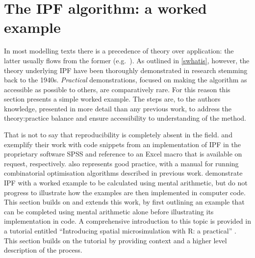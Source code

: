 \documentclass[a4paper,10pt]{article}
\begin{document}
\section{The IPF algorithm: a worked example} \label{s:theory}
In most modelling texts there is a precedence of theory over
application: the latter usually flows from the former
(e.g.~\citealp{batty1976urban}).  
As outlined in \cref{swhatis}, however, the theory underlying IPF have
been thoroughly demonstrated in research stemming back to the 1940s.
\emph{Practical} demonstrations, focused on making the
algorithm as accessible as possible to others,
are comparatively rare. For this reason this section presents a
simple worked example. The steps are, to the authors knowledge, presented in
more detail than any previous work, to address the theory:practice balance and
ensure accessibility to understanding of the method.

That is not to say that reproducibility is completely absent in the field.
\citet{Simpson2005} and \citet{Norman1999a}
exemplify their work with code snippets from an implementation
of IPF in the proprietary software SPSS and reference to
an Excel macro that is available on request, respectively.
\citet{Williamson2007} also represents
good practice, with a manual for running 
combinatorial optimisation algorithms described in previous work.
\citet{Ballas2005c} demonstrate IPF with a worked example
to be calculated using mental arithmetic, but do not progress to
illustrate how the examples are then implemented in computer code.
This section builds on and extends this work, by first outlining an example that
can be completed using mental arithmetic alone before illustrating its
implementation in code. A comprehensive introduction to
this topic
is provided in a tutorial entitled
 ``Introducing spatial microsimulation with R: a practical'' \citep{lovelace2014introducing}. This section builds on the tutorial by providing
context and a higher level description of the process.



\end{document}
